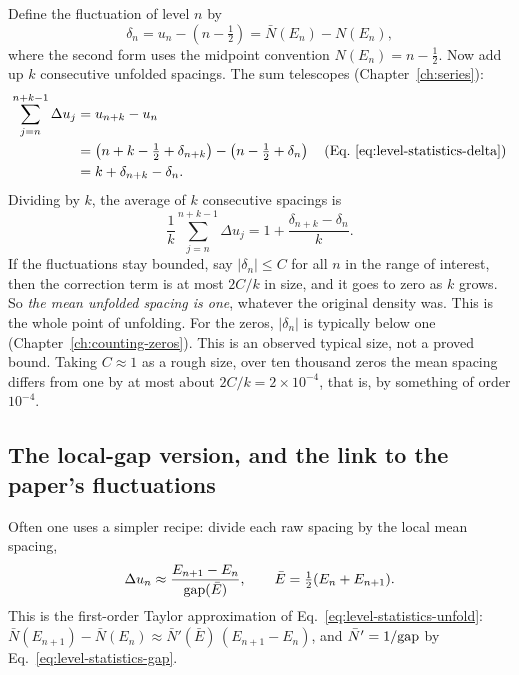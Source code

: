 Define the fluctuation of level $n$ by
\begin{equation}
\delta_n=u_n-\left(n-\tfrac12\right)=\bar N(E_n)-N(E_n),
\label{eq:level-statistics-delta}
\end{equation}
where the second form uses the midpoint convention $N(E_n)=n-\tfrac12$. Now add up $k$ consecutive unfolded spacings. The sum telescopes (Chapter~\ref{ch:series}):
\begin{align}
\sum_{j=n}^{n+k-1}\Delta u_j &= u_{n+k}-u_n \nonumber\\
&=\left(n+k-\tfrac12+\delta_{n+k}\right)-\left(n-\tfrac12+\delta_n\right)
\quad\text{(Eq.~\eqref{eq:level-statistics-delta})}\nonumber\\
&=k+\delta_{n+k}-\delta_n .
\end{align}
Dividing by $k$, the average of $k$ consecutive spacings is
\begin{equation}
\frac{1}{k}\sum_{j=n}^{n+k-1}\Delta u_j = 1+\frac{\delta_{n+k}-\delta_n}{k}.
\label{eq:level-statistics-meanone}
\end{equation}
If the fluctuations stay bounded, say $|\delta_n|\le C$ for all $n$ in the range of interest, then the correction term is at most $2C/k$ in size, and it goes to zero as $k$ grows. So \emph{the mean unfolded spacing is one}, whatever the original density was. This is the whole point of unfolding. For the zeros, $|\delta_n|$ is typically below one (Chapter~\ref{ch:counting-zeros}). This is an observed typical size, not a proved bound. Taking $C\approx1$ as a rough size, over ten thousand zeros the mean spacing differs from one by at most about $2C/k=2\times10^{-4}$, that is, by something of order $10^{-4}$.

\subsection{The local-gap version, and the link to the paper's fluctuations}

Often one uses a simpler recipe: divide each raw spacing by the local mean spacing,
\begin{equation}
\Delta u_n\approx\frac{E_{n+1}-E_n}{\mathrm{gap}(\bar E)},\qquad \bar E=\tfrac12(E_n+E_{n+1}).
\label{eq:level-statistics-localgap}
\end{equation}
This is the first-order Taylor approximation of Eq.~\eqref{eq:level-statistics-unfold}: $\bar N(E_{n+1})-\bar N(E_n)\approx \bar N'(\bar E)\,(E_{n+1}-E_n)$, and $\bar N'=1/\mathrm{gap}$ by Eq.~\eqref{eq:level-statistics-gap}.

